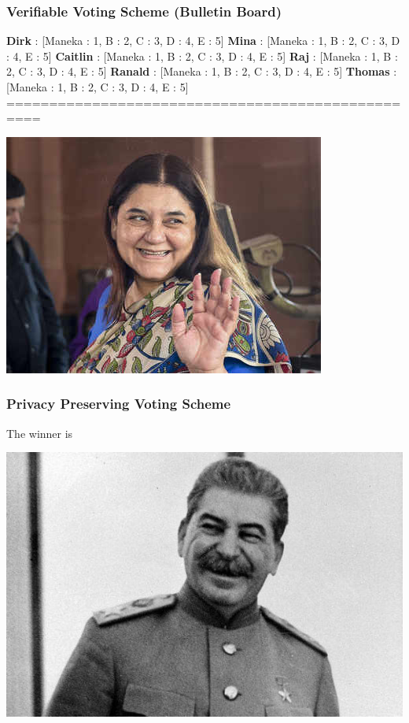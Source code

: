 \documentclass{beamer}
\begin{document}
\begin{frame}
\frametitle{Verifiable Voting Scheme (Bulletin Board)}
\textbf{Dirk} : [Maneka : 1, B : 2, C : 3, D : 4, E : 5]\newline
\textbf{Mina} : [Maneka : 1, B : 2, C : 3, D : 4, E : 5]\newline
\textbf{Caitlin} : [Maneka : 1, B : 2, C : 3, D : 4, E : 5]\newline
\textbf{Raj} :  [Maneka : 1, B : 2, C : 3, D : 4, E : 5]\newline
\textbf{Ranald} :  [Maneka : 1, B : 2, C : 3, D : 4, E : 5]\newline
\textbf{Thomas} : [Maneka : 1, B : 2, C : 3, D : 4, E : 5]\newline
==================================================\newline \pause
\begin{center}
\includegraphics[scale=0.3]{happy.jpg}
\end{center}
\end{frame}


\begin{frame}
\frametitle{Privacy Preserving Voting Scheme}
The winner is \pause
\begin{center}
\includegraphics[scale=0.3]{happystalin.jpg}
\end{center}
\end{frame}
\end{document}
